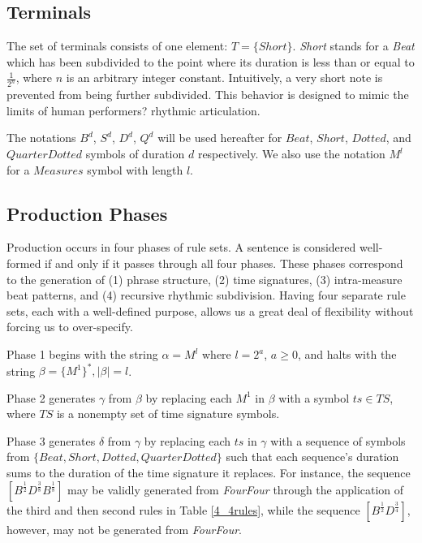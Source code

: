 \documentclass{article}
\begin{document}
\subsection{Terminals}

The set of terminals consists of one element: $T=\{Short\}$. \emph{Short} stands for a \emph{Beat} which has been subdivided to the point where its duration is less than or equal to $\frac{1}{2^n}$, where $n$ is an arbitrary integer constant. Intuitively, a very short note is prevented from being further subdivided. This behavior is designed to mimic the limits of human performers? rhythmic articulation.

The notations $B^d$, $S^d$, $D^d$, $Q^d$ will be used hereafter for $Beat$, $Short$, $Dotted$, and $QuarterDotted$ symbols of duration $d$ respectively. We also use the notation $M^l$ for a $Measures$ symbol with length $l$.

\subsection{Production Phases}

Production occurs in four phases of rule sets. A sentence is considered well-formed if and only if it passes through all four phases. These phases correspond to the generation of (1) phrase structure, (2) time signatures, (3) intra-measure beat patterns, and (4) recursive rhythmic subdivision. Having four separate rule sets, each with a well-defined purpose, allows us a great deal of flexibility without forcing us to over-specify.

Phase 1 begins with the string $\alpha = M^l$ where $l=2^a$, $a \geq 0$, and halts with the string $\beta = \{ M^1 \}^*, |\beta| = l$.

Phase 2 generates $\gamma$ from $\beta$ by replacing each $M^1$ in $\beta$ with a symbol $ts \in TS$, where $TS$ is a nonempty set of time signature symbols.

Phase 3 generates $\delta$ from $\gamma$ by replacing each $ts$ in $\gamma$ with a sequence of symbols from $\{Beat,\allowbreak Short,\allowbreak Dotted,\allowbreak QuarterDotted \}$ such that each sequence's duration sums to the duration of the time signature it replaces. For instance, the sequence
$[B^\frac{1}{2} D^\frac{3}{8} B^\frac{1}{8}]$ may be validly generated from \emph{FourFour} through the application of the third and then second rules in Table \ref{4_4rules}, 
while the sequence $[B^\frac{1}{2} D^\frac{3}{4}]$, however, may not be generated from \emph{FourFour}.
\end{document}
